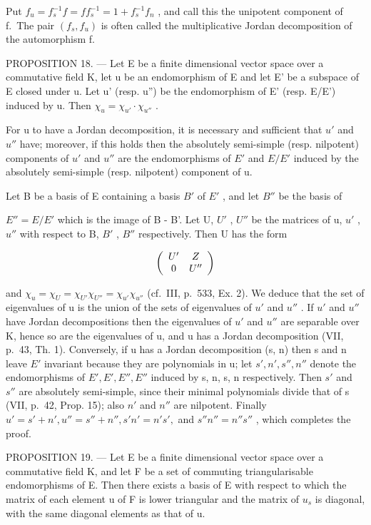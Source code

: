 Put \(f_{u}=f_{s}^{-1}f=ff_{s}^{-1}=1+f_{s}^{-1}f_{n}\) , and call this the unipotent component of f.~The pair \((f_{s},f_{u})\) is often called the multiplicative Jordan decomposition of the automorphism f.

PROPOSITION 18. --- Let E be a finite dimensional vector space over a commutative field K, let u be an endomorphism of E and let E' be a subspace of E closed under u. Let u' (resp. u'') be the endomorphism of E' (resp. E/E') induced by u. Then \(\chi_{u} = \chi_{u'} \cdot \chi_{u''}\) .

For u to have a Jordan decomposition, it is necessary and sufficient that \(u'\) and \(u''\) have; moreover, if this holds then the absolutely semi-simple (resp. nilpotent) components of \(u'\) and \(u''\) are the endomorphisms of \(E'\) and \(E/E'\) induced by the absolutely semi-simple (resp. nilpotent) component of u.

Let B be a basis of E containing a basis \(B'\) of \(E'\) , and let \(B''\) be the basis of

\(E'' = E/E'\) which is the image of B - B'. Let U, \(U'\) , \(U''\) be the matrices of u, \(u'\) , \(u''\) with respect to B, \(B'\) , \(B''\) respectively. Then U has the form

\[
\left( \begin{array}{c c} U ^ {\prime} & Z \\ 0 & U ^ {\prime \prime} \end{array} \right)
\]

and \(\chi_{u} = \chi_{U} = \chi_{U'} \chi_{U''} = \chi_{u'} \chi_{u''}\) (cf.~III, p.~533, Ex. 2). We deduce that the set of eigenvalues of u is the union of the sets of eigenvalues of \(u'\) and \(u''\) . If \(u'\) and \(u''\) have Jordan decompositions then the eigenvalues of \(u'\) and \(u''\) are separable over K, hence so are the eigenvalues of u, and u has a Jordan decomposition (VII, p.~43, Th. 1). Conversely, if u has a Jordan decomposition (s, n) then s and n leave \(E'\) invariant because they are polynomials in u; let \(s', n', s'', n''\) denote the endomorphisms of \(E', E', E'', E''\) induced by s, n, s, n respectively. Then \(s'\) and \(s''\) are absolutely semi-simple, since their minimal polynomials divide that of s (VII, p.~42, Prop. 15); also \(n'\) and \(n''\) are nilpotent. Finally \(u' = s' + n', u'' = s'' + n'', s'n' = n's',\) and \(s''n'' = n''s''\) , which completes the proof.

PROPOSITION 19. --- Let E be a finite dimensional vector space over a commutative field K, and let F be a set of commuting triangularisable endomorphisms of E. Then there exists a basis of E with respect to which the matrix of each element u of F is lower triangular and the matrix of \(u_{s}\) is diagonal, with the same diagonal elements as that of u.

